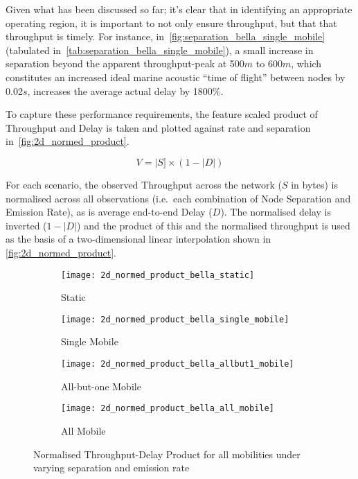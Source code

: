 Given what has been discussed so far; it's clear that in identifying an appropriate operating region, it is important to not only ensure throughput, but that that throughput is timely.
For instance, in~\autoref{fig:separation_bella_single_mobile} (tabulated in~\autoref{tab:separation_bella_single_mobile}), a small increase in separation beyond the apparent throughput-peak at 500$m$ to 600$m$, which constitutes an increased ideal marine acoustic ``time of flight'' between nodes by 0.02$s$, increases the average actual delay by 1800\%. 

To capture these performance requirements, the feature scaled product of Throughput and Delay is taken and plotted against rate and separation in~\autoref{fig:2d_normed_product}.

\begin{equation}
V = |S] \times (1 - |D|)
\label{eq:normed_product}
\end{equation}

For each scenario, the observed Throughput across the network ($S$ in bytes) is normalised across all observations (i.e.\ each combination of Node Separation and Emission Rate), as is average end-to-end Delay ($D$). The normalised delay is inverted ($1-|D|$) and the product of this and the normalised throughput is used as the basis of a two-dimensional linear interpolation shown in \autoref{fig:2d_normed_product}.

\begin{figure}[h]
	\begin{subfigure}[t]{0.5\textwidth}
		\centering
		\texttt{[image: 2d\_normed\_product\_bella\_static]}
		\caption{Static}
		\label{fig:2d_normed_product_bella_static}
	\end{subfigure}
	\begin{subfigure}[t]{0.5\textwidth}
		\centering
		\texttt{[image: 2d\_normed\_product\_bella\_single\_mobile]}
		\caption{Single Mobile}
		\label{fig:2d_normed_product_bella_single_mobile}
	\end{subfigure}
	
	\begin{subfigure}[t]{0.5\textwidth}
		\centering
		\texttt{[image: 2d\_normed\_product\_bella\_allbut1\_mobile]}
		\caption{All-but-one Mobile}
		\label{fig:2d_normed_product_bella_allbut1_mobile}
	\end{subfigure}
	\begin{subfigure}[t]{0.5\textwidth}
		\centering
		\texttt{[image: 2d\_normed\_product\_bella\_all\_mobile]}
		\caption{All Mobile}
		\label{fig:2d_normed_product_bella_all_mobile}
	\end{subfigure}
	\caption{Normalised Throughput-Delay Product for all mobilities under varying separation and emission rate}
	\label{fig:2d_normed_product}
\end{figure}


